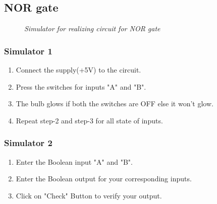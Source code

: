 	\subsection{NOR gate}
		\begin{figure}[ht]
			\centering 
			\hfill
			\caption{\textit{Simulator for realizing circuit for NOR gate}}
		\end{figure}
		\subsubsection{Simulator 1}
			\begin{enumerate}
				\tightlist
				\item Connect the supply(+5V) to the circuit.
				\item Press the switches for inputs "A" and "B".			
				\item The bulb glows if both the switches are OFF else it won't glow.
				\item Repeat step-2 and step-3 for all state of inputs.
			\end{enumerate}
		\subsubsection{Simulator 2}
			\begin{enumerate}
				\tightlist
				\item Enter the Boolean input "A" and "B".
				\item Enter the Boolean output for your corresponding inputs.
				\item Click on "Check" Button to verify your output.			
			\end{enumerate}

